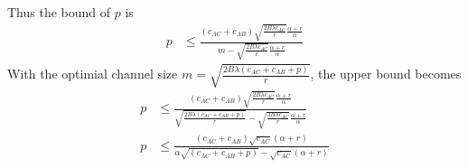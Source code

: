 \documentclass[12pt]{article}
\theoremstyle{plain}
\theoremstyle{remark}
\theoremstyle{definition}
\renewcommand{\leq}{\leqslant}
\renewcommand{\leq}{\leqslant}
\begin{document}
Thus the bound of $p$ is 
\begin{align}
  p &\leq  \frac{(c_{AC}+c_{AB})\sqrt{\frac{2B\lambda c_{AC}}{r}}\frac{\alpha + r}{\alpha}}{m-\sqrt{\frac{2B\lambda c_{AC}}{r}}\frac{\alpha + r}{\alpha}}
\end{align}
With the optimial channel size $m=\sqrt{\frac{2B\lambda (c_{AC}+c_{AB}+p)}{r}}$, the upper bound becomes
\begin{align}
  p &\leq  \frac{(c_{AC}+c_{AB})\sqrt{\frac{2B\lambda c_{AC}}{r}}\frac{\alpha + r}{\alpha}}{\sqrt{\frac{2B\lambda (c_{AC}+c_{AB}+p)}{r}}-\sqrt{\frac{2B\lambda c_{AC}}{r}}\frac{\alpha + r}{\alpha}}\\
  p &\leq  \frac{(c_{AC}+c_{AB})\sqrt{c_{AC}}(\alpha + r)}{\alpha\sqrt{(c_{AC}+c_{AB}+p)}-\sqrt{c_{AC}}(\alpha + r)}
\end{align}
\end{document}
